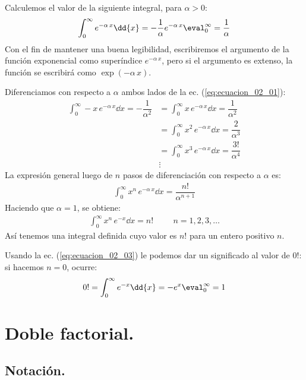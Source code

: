 Calculemos el valor de la siguiente integral, para $\alpha > 0$:
\begin{align}
\int_{0}^{\infty} e^{-\alpha \, x} \dd{x} = - \dfrac{1}{\alpha} e^{-\alpha \, x}\eval_{0}^{\infty} = \dfrac{1}{\alpha}
\label{eq:ecuacion_02_01}
\end{align}
Con el fin de mantener una buena legibilidad, escribiremos el argumento de la función exponencial como superíndice $e^{-\alpha \, x}$, pero si el argumento es extenso, la función se escribirá como $\exp(-\alpha \, x)$.
\par
Diferenciamos con respecto a $\alpha$ ambos lados de la ec. (\ref{eq:ecuacion_02_01}):
\begin{align*}
\int_{0}^{\infty} - x \, e^{-\alpha \, x} \dd{x} = - \dfrac{1}{\alpha^{2}} &= \int_{0}^{\infty} x \, e^{-\alpha \, x} \dd{x} = \dfrac{1}{\alpha^{2}} \\[0.5em]
&= \int_{0}^{\infty} x^{2} \, e^{-\alpha \, x} \dd{x} = \dfrac{2}{\alpha^{3}} \\[0.5em]
&= \int_{0}^{\infty} x^{3} \, e^{-\alpha \, x} \dd{x} = \dfrac{3!}{\alpha^{4}} \\
& \vdots
\end{align*}
La expresión general luego de $n$ pasos de diferenciación con respecto a $\alpha$ es:
\begin{align}
\int_{0}^{\infty} x^{n} \, e^{-\alpha \, x} \dd{x} = \dfrac{n!}{\alpha^{n+1}}
\label{eq:ecuacion_02_02}
\end{align}
Haciendo que $\alpha = 1$, se obtiene:
\begin{align}
\int_{0}^{\infty} x^{n} \, e^{-x} \dd{x} = n! \hspace{1cm} n = 1, 2, 3, \ldots
\label{eq:ecuacion_02_03}
\end{align}
Así tenemos una integral definida cuyo valor es $n!$ para un entero positivo $n$.
\par
Usando la ec. (\ref{eq:ecuacion_02_03}) le podemos dar un significado al valor de $0!$: si hacemos $n = 0$, ocurre:
\begin{align}
0! = \int_{0}^{\infty} e^{-x} \dd{x} = -e^{x}\eval_{0}^{\infty} = 1
\label{eq:ecuacion_02_04}
\end{align}

\section{Doble factorial.}

\subsection{Notación.}

